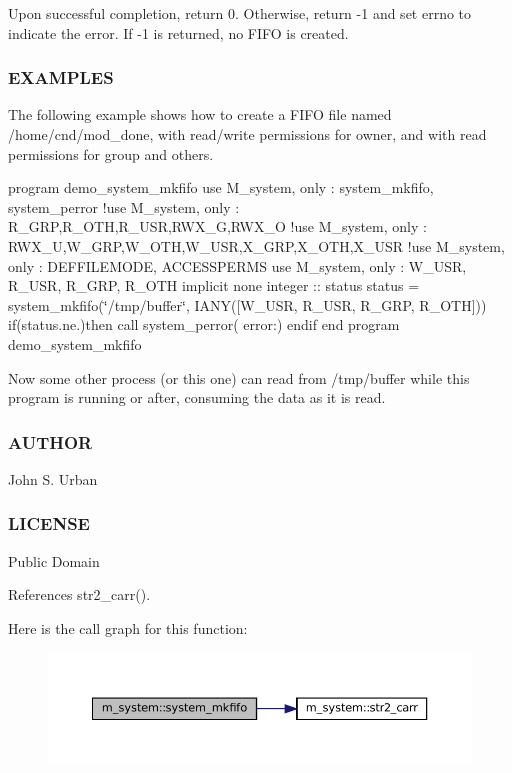 Upon successful completion, return 0. Otherwise, return -\/1 and set errno to indicate the error. If -\/1 is returned, no F\+I\+FO is created.

\subsubsection*{E\+X\+A\+M\+P\+L\+ES}

The following example shows how to create a F\+I\+FO file named /home/cnd/mod\+\_\+done, with read/write permissions for owner, and with read permissions for group and others.

program demo\+\_\+system\+\_\+mkfifo use M\+\_\+system, only \+: system\+\_\+mkfifo, system\+\_\+perror !use M\+\_\+system, only \+: R\+\_\+\+G\+RP,R\+\_\+\+O\+TH,R\+\_\+\+U\+SR,R\+W\+X\+\_\+G,R\+W\+X\+\_\+O !use M\+\_\+system, only \+: R\+W\+X\+\_\+U,W\+\_\+\+G\+RP,W\+\_\+\+O\+TH,W\+\_\+\+U\+SR,X\+\_\+\+G\+RP,X\+\_\+\+O\+TH,X\+\_\+\+U\+SR !use M\+\_\+system, only \+: D\+E\+F\+F\+I\+L\+E\+M\+O\+DE, A\+C\+C\+E\+S\+S\+P\+E\+R\+MS use M\+\_\+system, only \+: W\+\_\+\+U\+SR, R\+\_\+\+U\+SR, R\+\_\+\+G\+RP, R\+\_\+\+O\+TH implicit none integer \+:\+: status status = system\+\_\+mkfifo(\char`\"{}/tmp/buffer\char`\"{}, I\+A\+N\+Y(\mbox{[}\+W\+\_\+\+U\+S\+R, R\+\_\+\+U\+S\+R, R\+\_\+\+G\+R\+P, R\+\_\+\+O\+T\+H\mbox{]})) if(status.\+ne.)then call system\+\_\+perror( error\+:\textquotesingle{}) endif end program demo\+\_\+system\+\_\+mkfifo

Now some other process (or this one) can read from /tmp/buffer while this program is running or after, consuming the data as it is read.

\subsubsection*{A\+U\+T\+H\+OR}

John S. Urban \subsubsection*{L\+I\+C\+E\+N\+SE}

Public Domain 

References str2\+\_\+carr().

Here is the call graph for this function\+:\nopagebreak
\begin{figure}[H]
\begin{center}
\leavevmode
\includegraphics[width=350pt]{namespacem__system_ab2d95258ee26b85a0283538880775475_cgraph}
\end{center}
\end{figure}
\mbox{\label{namespacem__system_a622cc67c03e8cdea1d4c2430bb36081b}} 
